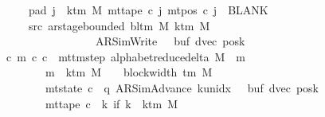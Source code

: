 \begin{isabellebody}
\ \ \ \ \ \ \ pad{}{\isacharcolon}{\kern0pt}\ {\isachardoublequoteopen}{\isasymforall}j\ {\isasymge}\ k{\isacharunderscore}{\kern0pt}tm\ M{\isachardot}{\kern0pt}\ mt{\isacharunderscore}{\kern0pt}tape\ c{}\ j\ {\isacharparenleft}{\kern0pt}mt{\isacharunderscore}{\kern0pt}pos\ c{}\ j{\isacharparenright}{\kern0pt}\ {\isacharequal}{\kern0pt}\ BLANK{}{\isachardoublequoteclose}\isanewline
\ \ \ \ \ \ \ src{}{\isacharcolon}{\kern0pt}\ {\isachardoublequoteopen}ar{\isacharunderscore}{\kern0pt}stage{\isacharunderscore}{\kern0pt}bounded\ {\isacharparenleft}{\kern0pt}bl{\isacharunderscore}{\kern0pt}tm\ M{\isacharparenright}{\kern0pt}\ {\isacharparenleft}{\kern0pt}k{\isacharunderscore}{\kern0pt}tm\ M{\isacharparenright}{\kern0pt}\isanewline
\ \ \ \ \ \ \ \ \ \ \ \ \ \ \ \ \ \ \ {\isacharparenleft}{\kern0pt}AR{\isacharunderscore}{\kern0pt}SimWrite{\isacharcomma}{\kern0pt}\ {}{\isacharcomma}{\kern0pt}\ {}{\isacharcomma}{\kern0pt}\ buf{\isacharcomma}{\kern0pt}\ dvec{\isacharcomma}{\kern0pt}\ posk{\isacharparenright}{\kern0pt}{\isachardoublequoteclose}\isanewline
\ \ \ {\isachardoublequoteopen}{\isasymexists}c\ m{\isachardot}{\kern0pt}\ {\isacharparenleft}{\kern0pt}c{}{\isacharcomma}{\kern0pt}\ c{\isacharparenright}{\kern0pt}\ {\isasymin}\ {\isacharparenleft}{\kern0pt}mttm{\isacharunderscore}{\kern0pt}step\ {\isacharparenleft}{\kern0pt}alphabet{\isacharunderscore}{\kern0pt}reduce{\isacharunderscore}{\kern0pt}delta\ M{\isacharparenright}{\kern0pt}{\isacharparenright}{\kern0pt}\ {\isacharcircum}{\kern0pt}{\isacharcircum}{\kern0pt}\ m\isanewline
\ \ \ \ \ \ \ \ \ {\isasymand}\ m\ {\isasymle}\ k{\isacharunderscore}{\kern0pt}tm\ M\ {\isacharasterisk}{\kern0pt}\ {\isacharparenleft}{\kern0pt}{}\ {\isacharasterisk}{\kern0pt}\ block{\isacharunderscore}{\kern0pt}width\ {\isacharparenleft}{\kern0pt}{\isasymGamma}{\isacharunderscore}{\kern0pt}tm\ M{\isacharparenright}{\kern0pt}{\isacharparenright}{\kern0pt}\isanewline
\ \ \ \ \ \ \ \ \ {\isasymand}\ mt{\isacharunderscore}{\kern0pt}state\ c\ {\isacharequal}{\kern0pt}\ {\isacharparenleft}{\kern0pt}q{\isacharcomma}{\kern0pt}\ AR{\isacharunderscore}{\kern0pt}SimAdvance{\isacharcomma}{\kern0pt}\ k{\isacharunderscore}{\kern0pt}unidx\ {}{\isacharcomma}{\kern0pt}\ {}{\isacharcomma}{\kern0pt}\ buf{\isacharcomma}{\kern0pt}\ dvec{\isacharcomma}{\kern0pt}\ posk{\isacharparenright}{\kern0pt}\isanewline
\ \ \ \ \ \ \ \ \ {\isasymand}\ mt{\isacharunderscore}{\kern0pt}tape\ c\ {\isacharequal}{\kern0pt}\ {\isacharparenleft}{\kern0pt}{\isasymlambda}k{\isachardot}{\kern0pt}\ if\ k\ {\isacharless}{\kern0pt}\ k{\isacharunderscore}{\kern0pt}tm\ M\isanewline

\end{isabellebody}
